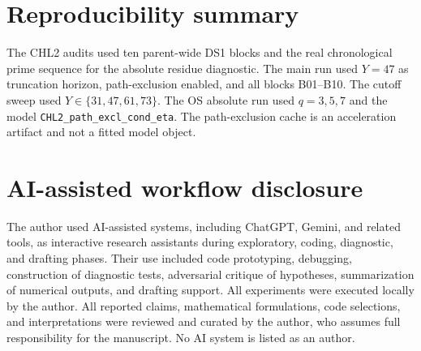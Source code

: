 \documentclass[10pt]{article}
\begin{document}
\section{Reproducibility summary}
The CHL2 audits used ten parent-wide DS1 blocks and the real chronological prime sequence for the absolute residue diagnostic. The main run used $Y=47$ as truncation horizon, path-exclusion enabled, and all blocks B01--B10. The cutoff sweep used $Y\in\{31,47,61,73\}$. The OS absolute run used $q=3,5,7$ and the model \texttt{CHL2\_path\_excl\_cond\_eta}. The path-exclusion cache is an acceleration artifact and not a fitted model object.
\section{AI-assisted workflow disclosure}
The author used AI-assisted systems, including ChatGPT, Gemini, and related tools, as interactive research assistants during exploratory, coding, diagnostic, and drafting phases. Their use included code prototyping, debugging, construction of diagnostic tests, adversarial critique of hypotheses, summarization of numerical outputs, and drafting support. All experiments were executed locally by the author. All reported claims, mathematical formulations, code selections, and interpretations were reviewed and curated by the author, who assumes full responsibility for the manuscript. No AI system is listed as an author.
\end{document}
